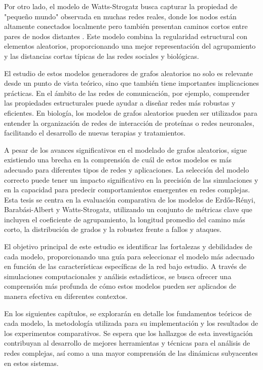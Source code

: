 Por otro lado, el modelo de Watts-Strogatz busca capturar la propiedad de "pequeño mundo" observada en muchas redes reales, donde los nodos están altamente conectados localmente pero también presentan caminos cortos entre pares de nodos distantes \citep{Watts1998}. Este modelo combina la regularidad estructural con elementos aleatorios, proporcionando una mejor representación del agrupamiento y las distancias cortas típicas de las redes sociales y biológicas.

El estudio de estos modelos generadores de grafos aleatorios no solo es relevante desde un punto de vista teórico, sino que también tiene importantes implicaciones prácticas. En el ámbito de las redes de comunicación, por ejemplo, comprender las propiedades estructurales puede ayudar a diseñar redes más robustas y eficientes. En biología, los modelos de grafos aleatorios pueden ser utilizados para entender la organización de redes de interacción de proteínas o redes neuronales, facilitando el desarrollo de nuevas terapias y tratamientos.

A pesar de los avances significativos en el modelado de grafos aleatorios, sigue existiendo una brecha en la comprensión de cuál de estos modelos es más adecuado para diferentes tipos de redes y aplicaciones. La selección del modelo correcto puede tener un impacto significativo en la precisión de las simulaciones y en la capacidad para predecir comportamientos emergentes en redes complejas. Esta tesis se centra en la evaluación comparativa de los modelos de Erdős-Rényi, Barabási-Albert y Watts-Strogatz, utilizando un conjunto de métricas clave que incluyen el coeficiente de agrupamiento, la longitud promedio del camino más corto, la distribución de grados y la robustez frente a fallos y ataques.

El objetivo principal de este estudio es identificar las fortalezas y debilidades de cada modelo, proporcionando una guía para seleccionar el modelo más adecuado en función de las características específicas de la red bajo estudio. A través de simulaciones computacionales y análisis estadísticos, se busca ofrecer una comprensión más profunda de cómo estos modelos pueden ser aplicados de manera efectiva en diferentes contextos.

En los siguientes capítulos, se explorarán en detalle los fundamentos teóricos de cada modelo, la metodología utilizada para su implementación y los resultados de los experimentos comparativos. Se espera que los hallazgos de esta investigación contribuyan al desarrollo de mejores herramientas y técnicas para el análisis de redes complejas, así como a una mayor comprensión de las dinámicas subyacentes en estos sistemas.

